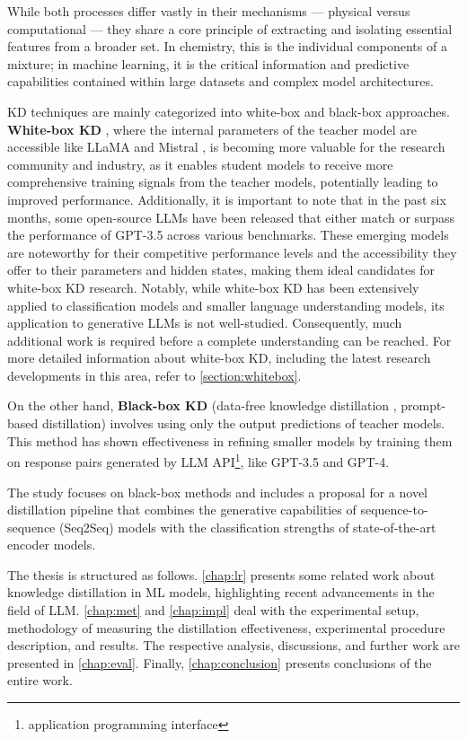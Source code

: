 While both processes differ vastly in their mechanisms — physical versus computational — they share a core principle of extracting and isolating essential features from a broader set. In chemistry, this is the individual components of a mixture; in machine learning, it is the critical information and predictive capabilities contained within large datasets and complex model architectures.

KD techniques are mainly categorized into white-box and black-box approaches. \textbf{White-box KD} \cite{distilling}, where the internal parameters of the teacher model are accessible like LLaMA \cite{llama,llama2} and Mistral \cite{mistral}, is becoming more valuable for the research community and industry, as it enables student models to receive more comprehensive training signals from the teacher models, potentially leading to improved performance. Additionally, it is important to note that in the past six months, some open-source LLMs have been released that either match or surpass the performance of GPT-3.5 across various benchmarks. These emerging models are noteworthy for their competitive performance levels and the accessibility they offer to their parameters and hidden states, making them ideal candidates for white-box KD research. Notably, while white-box KD has been extensively applied to classification models and smaller language understanding models, its application to generative LLMs is not well-studied. Consequently, much additional work is required before a complete understanding can be reached. For more detailed information about white-box KD, including the latest research developments in this area, refer to \autoref{section:whitebox}.

On the other hand, \textbf{Black-box KD} (data-free knowledge distillation \cite{dfkd}, prompt-based distillation) involves using only the output predictions of teacher models. This method has shown effectiveness in refining smaller models by training them on response pairs generated by LLM API\footnote{application programming interface}, like GPT-3.5 and GPT-4.

The study focuses on black-box methods and includes a proposal for a novel distillation pipeline that combines the generative capabilities of sequence-to-sequence (Seq2Seq) models with the classification strengths of state-of-the-art encoder models.

The thesis is structured as follows. \autoref{chap:lr} presents some related work about knowledge distillation in ML models, highlighting recent advancements in the field of LLM\@. \autoref{chap:met} and \autoref{chap:impl} deal with the experimental setup, methodology of measuring the distillation effectiveness, experimental procedure description, and results. The respective analysis, discussions, and further work are presented in \autoref{chap:eval}. Finally, \autoref{chap:conclusion} presents conclusions of the entire work.

